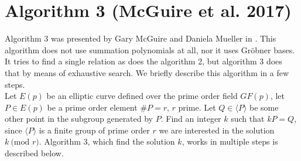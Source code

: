 \documentclass[thesis=M,english]{FITthesis}[2012/10/20]
\theoremstyle{remark}
\theoremstyle{definition}
\begin{document}
\section{Algorithm 3 (McGuire et al. 2017)}
Algorithm 3 was presented by Gary McGuire and Daniela Mueller in \cite{guire}. This algorithm does not use summation polynomials at all, nor it uses Gröbner bases. It tries to find a single relation as does the algorithm 2, but algorithm 3 does that by means of exhaustive search. We briefly describe this algorithm in a few steps. \\

\noindent Let $E(p)$ be an elliptic curve defined over the prime order field $GF(p)$, let $P \in E(p)$ be a prime order element $\#P = r$, $r$ prime. Let $Q \in \langle P \rangle$ be some other point in the subgroup generated by $P.$ Find an integer $k$ such that $kP = Q,$ since $\langle P \rangle$ is a finite group of prime order $r$ we are interested in the solution $k\ \text{(mod }r)$. Algorithm 3, which find the solution $k$, works in multiple steps is described below.
\end{document}

